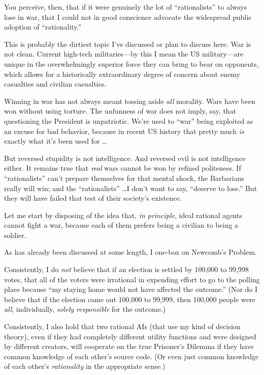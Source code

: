 {
 You perceive, then, that if it were genuinely the lot of
``rationalists'' to always lose in
war, that I could not in good conscience advocate the widespread public
adoption of ``rationality.''}

{
 This is probably the dirtiest topic I've discussed
or plan to discuss here. War is not clean. Current high-tech
militaries---by this I mean the US military---are unique in the
overwhelmingly superior force they can bring to bear on opponents,
which allows for a historically extraordinary degree of concern about
enemy casualties and civilian casualties.}

{
 Winning in war has not always meant tossing aside \textit{all}
morality. Wars have been won without using torture. The unfunness of
war does not imply, say, that questioning the President is unpatriotic.
We're used to
``war'' being exploited as an excuse
for bad behavior, because in recent US history that pretty much
\textit{is} exactly what it's been used for \ldots}

{
 But reversed stupidity is not intelligence. And reversed evil is
not intelligence either. It remains true that \textit{real} wars cannot
be won by refined politeness. If
``rationalists''
can't prepare themselves for that mental shock, the
Barbarians really will win; and the
``rationalists'' \ldots I
don't want to say, ``deserve to
lose.'' But they will have failed that test of their
society's existence.}

{
 Let me start by disposing of the idea that, \textit{in principle},
ideal rational agents cannot fight a war, because each of them prefers
being a civilian to being a soldier.}

{
 As has already been discussed at some length, I one-box on
Newcomb's Problem.}

{
 Consistently, I do \textit{not} believe that if an election is
settled by 100,000 to 99,998 votes, that all of the voters were
irrational in expending effort to go to the polling place because
``my staying home would not have affected the
outcome.'' (Nor do I believe that if the election
came out 100,000 to 99,999, then 100,000 people were \textit{all},
individually, \textit{solely responsible} for the outcome.)}

{
 Consistently, I also hold that two rational AIs (that use my kind
of decision theory), even if they had completely different utility
functions and were designed by different creators, will cooperate on
the true Prisoner's Dilemma if they have common
knowledge of each other's source code. (Or even just
common knowledge of each other's \textit{rationality}
in the appropriate sense.)}

